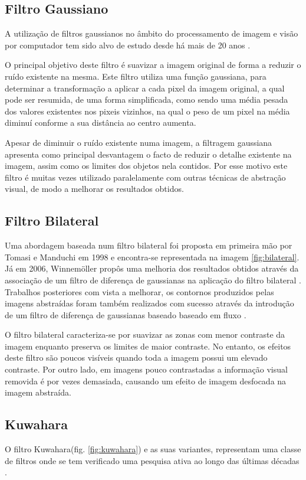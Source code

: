 \subsection{Filtro Gaussiano} \label{subsec:gaussian}
A utilização de filtros gaussianos no âmbito do processamento de imagem e visão por computador tem sido alvo de estudo desde há mais de 20 anos \cite{373563}.

O principal objetivo deste filtro é suavizar a imagem original de forma a reduzir o ruído existente na mesma. Este filtro utiliza uma função gaussiana, para determinar a transformação a aplicar a cada pixel da imagem original, a qual pode ser resumida, de uma forma simplificada, como sendo uma média pesada dos valores existentes nos pixeis vizinhos, na qual o peso de um pixel na média diminuí conforme a sua distância ao centro aumenta.

Apesar de diminuir o ruído existente numa imagem, a filtragem gaussiana apresenta como principal desvantagem o facto de reduzir o detalhe existente na imagem, assim como os limites dos objetos nela contidos. Por esse motivo este filtro é muitas vezes utilizado paralelamente com outras técnicas de abstração visual, de modo a melhorar os resultados obtidos.

\subsection{Filtro Bilateral} \label{subsec:bilateral}
Uma abordagem baseada num filtro bilateral foi proposta em primeira mão por Tomasi e Manduchi em 1998 \cite{Tomasi1998} e encontra-se representada na imagem \ref{fig:bilateral}. Já em 2006, Winnemöller propôs uma melhoria dos resultados obtidos através da associação de um filtro de diferença de gaussianas na aplicação do filtro bilateral \cite{Winnemoller2006}. Trabalhos posteriores com vista a melhorar, os contornos produzidos pelas imagens abstraídas foram também realizados com sucesso através da introdução de um filtro de diferença de gaussianas baseado baseado em fluxo \cite{Kang2009}.

O filtro bilateral caracteriza-se por suavizar as zonas com menor contraste da imagem enquanto preserva os limites de maior contraste. No entanto, os efeitos deste filtro são poucos visíveis quando toda a imagem possui um elevado contraste. Por outro lado, em imagens pouco contrastadas a informação visual removida é por vezes demasiada, causando um efeito de imagem desfocada na imagem abstraída.

\subsection{Kuwahara} \label{subsec:kuwahara}
O filtro Kuwahara(fig. \ref{fig:kuwahara}) e as suas variantes, representam uma classe de filtros onde se tem verificado uma pesquisa ativa ao longo das últimas décadas \cite{Kyprianidis2009}.

